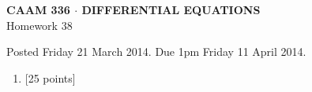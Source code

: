 \documentclass[10pt]{article}
\begin{document}
\vspace*{-5em}
\begin{center}
\large \textsf{\textbf{CAAM 336 $\cdot$ DIFFERENTIAL EQUATIONS}\\[0.5em]
Homework 38 }
\end{center}

Posted Friday 21 March 2014.  Due 1pm Friday 11 April 2014.

\begin{enumerate}\addtocounter{enumi}{37}
\item {[25 points]}  
\end{enumerate}
\end{document}
